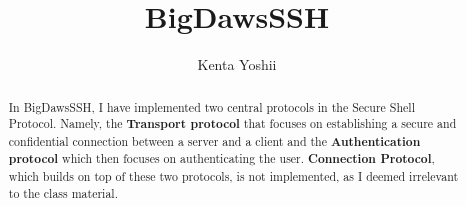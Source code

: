 \documentclass[10pt,sigconf]{acmart}
\begin{document}
\title{BigDawsSSH}

\author{Kenta Yoshii}










%
%



\begin{abstract}
  In BigDawsSSH, I have implemented two central protocols in the Secure Shell Protocol. Namely, the \textbf{Transport protocol} that focuses on establishing a secure and confidential connection between a server and a client and the \textbf{Authentication protocol} which then focuses on authenticating the user. \textbf{Connection Protocol}, which builds on top of these two protocols, is not implemented, as I deemed irrelevant to the class material. 
\end{abstract}

\maketitle
\pagestyle{plain}
\end{document}
